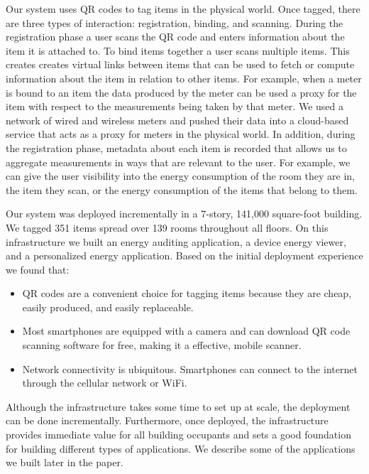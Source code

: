 Our system uses QR codes to tag items in the physical world.  Once tagged, there are three types of interaction: 
registration, binding, and scanning.  During the registration phase a user scans the QR code and enters information about the
item it is attached to.  To bind items together a user scans multiple items.  This creates creates virtual links between items that
can be used to fetch or compute information about the item in relation to other items.  For example, when a meter is bound
to an item the data produced by the meter can be used a proxy for the item with respect to the measurements being taken
by that meter.  We used a network of wired and wireless meters and pushed their data into a cloud-based service that
acts as a proxy for meters in the physical world.  In addition, during the registration phase, metadata about each item is recorded
that allows us to aggregate measurements in ways that are relevant to the user.  For example, 
we can give the user visibility into the energy consumption of the room they are in, the item they scan, or
the energy consumption of the items that belong to them.

Our system was deployed incrementally in a 7-story, 141,000 square-foot building.  
We tagged 351 items spread over 139 rooms throughout all floors.  On this infrastructure we built an energy auditing application,
a device energy viewer, and a personalized energy application.  Based on the initial deployment experience
we found that:

\begin{itemize}
\item QR codes are a convenient choice for tagging items because they are cheap, easily produced, and easily replaceable.
\item Most smartphones are equipped with a camera and can download QR code scanning software for free, making it a effective, mobile scanner.
\item Network connectivity is ubiquitous.  Smartphones can connect to the internet through the cellular network or WiFi.
\end{itemize}

\vspace{0.08in}

Although the infrastructure takes some time to set up at scale, the deployment can be done incrementally.  
Furthermore, once deployed, the infrastructure provides immediate value for all building occupants and sets a good foundation
for building different types of applications.  We describe some of the applications we built later in the paper.

